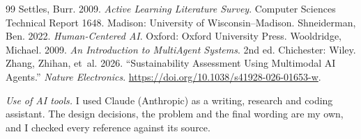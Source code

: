 \documentclass{article}
\begin{document}
\begin{thebibliography}{99}
Settles, Burr. 2009. \emph{Active Learning Literature Survey}. Computer Sciences Technical Report 1648. Madison: University of Wisconsin--Madison.
Shneiderman, Ben. 2022. \emph{Human-Centered AI}. Oxford: Oxford University Press.
Wooldridge, Michael. 2009. \emph{An Introduction to MultiAgent Systems}. 2nd ed. Chichester: Wiley.
Zhang, Zhihan, et~al. 2026. ``Sustainability Assessment Using Multimodal AI Agents.'' \emph{Nature Electronics}. \url{https://doi.org/10.1038/s41928-026-01653-w}.
\item[] \textit{Use of AI tools.} I used Claude (Anthropic) as a writing, research and coding assistant.
The design decisions, the problem and the final wording are my own, and I checked every reference
against its source.
\end{thebibliography}
\end{document}
